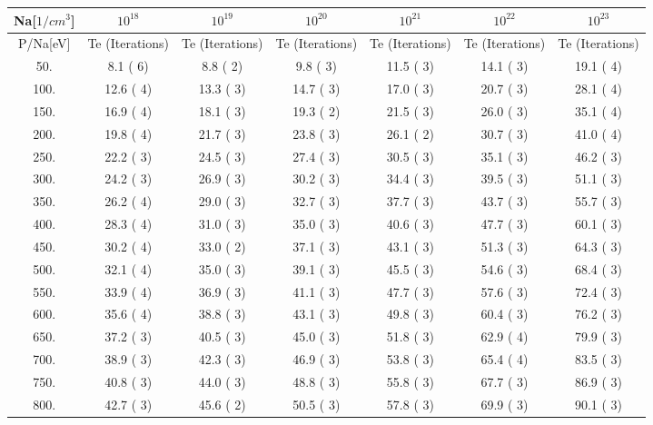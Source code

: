 \begin{tabular}{|c||c|c|c|c|c|c|}
\hline
Na[$1/cm^3$] & $10^{18}$ & $10^{19}$ & $10^{20}$ & $10^{21}$ & $10^{22}$ & $10^{23}$\tabularnewline
\hline
P/Na[eV] & Te (Iterations) &  Te (Iterations) &  Te (Iterations) &  Te (Iterations) &  Te (Iterations) &  Te (Iterations) \tabularnewline
\hline
\hline
   50. &     8.1 (      6) &     8.8 (      2) &     9.8 (      3) &    11.5 (      3) &    14.1 (      3) &    19.1 (      4)\tabularnewline
\hline
  100. &    12.6 (      4) &    13.3 (      3) &    14.7 (      3) &    17.0 (      3) &    20.7 (      3) &    28.1 (      4)\tabularnewline
\hline
  150. &    16.9 (      4) &    18.1 (      3) &    19.3 (      2) &    21.5 (      3) &    26.0 (      3) &    35.1 (      4)\tabularnewline
\hline
  200. &    19.8 (      4) &    21.7 (      3) &    23.8 (      3) &    26.1 (      2) &    30.7 (      3) &    41.0 (      4)\tabularnewline
\hline
  250. &    22.2 (      3) &    24.5 (      3) &    27.4 (      3) &    30.5 (      3) &    35.1 (      3) &    46.2 (      3)\tabularnewline
\hline
  300. &    24.2 (      3) &    26.9 (      3) &    30.2 (      3) &    34.4 (      3) &    39.5 (      3) &    51.1 (      3)\tabularnewline
\hline
  350. &    26.2 (      4) &    29.0 (      3) &    32.7 (      3) &    37.7 (      3) &    43.7 (      3) &    55.7 (      3)\tabularnewline
\hline
  400. &    28.3 (      4) &    31.0 (      3) &    35.0 (      3) &    40.6 (      3) &    47.7 (      3) &    60.1 (      3)\tabularnewline
\hline
  450. &    30.2 (      4) &    33.0 (      2) &    37.1 (      3) &    43.1 (      3) &    51.3 (      3) &    64.3 (      3)\tabularnewline
\hline
  500. &    32.1 (      4) &    35.0 (      3) &    39.1 (      3) &    45.5 (      3) &    54.6 (      3) &    68.4 (      3)\tabularnewline
\hline
  550. &    33.9 (      4) &    36.9 (      3) &    41.1 (      3) &    47.7 (      3) &    57.6 (      3) &    72.4 (      3)\tabularnewline
\hline
  600. &    35.6 (      4) &    38.8 (      3) &    43.1 (      3) &    49.8 (      3) &    60.4 (      3) &    76.2 (      3)\tabularnewline
\hline
  650. &    37.2 (      3) &    40.5 (      3) &    45.0 (      3) &    51.8 (      3) &    62.9 (      4) &    79.9 (      3)\tabularnewline
\hline
  700. &    38.9 (      3) &    42.3 (      3) &    46.9 (      3) &    53.8 (      3) &    65.4 (      4) &    83.5 (      3)\tabularnewline
\hline
  750. &    40.8 (      3) &    44.0 (      3) &    48.8 (      3) &    55.8 (      3) &    67.7 (      3) &    86.9 (      3)\tabularnewline
\hline
  800. &    42.7 (      3) &    45.6 (      2) &    50.5 (      3) &    57.8 (      3) &    69.9 (      3) &    90.1 (      3)\tabularnewline

\end{tabular}
